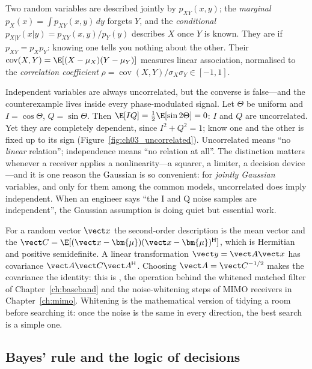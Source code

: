 Two random variables are described jointly by $p_{XY}(x,y)$; the \emph{marginal}
$p_X(x)=\int p_{XY}(x,y)\,dy$ forgets $Y$, and the \emph{conditional}
$p_{X|Y}(x|y)=p_{XY}(x,y)/p_Y(y)$ describes $X$ once $Y$ is known. They are  if
$p_{XY}=p_Xp_Y$: knowing one tells you nothing about the other. Their 
$\operatorname{cov}(X,Y)=\E[(X-\mu_X)(Y-\mu_Y)]$ measures linear association, normalised to the
\emph{correlation coefficient} $\rho=\operatorname{cov}(X,Y)/\sigma_X\sigma_Y\in[-1,1]$.


Independent variables are always uncorrelated, but the converse is false---and the
counterexample lives inside every phase-modulated signal. Let $\Theta$ be uniform and
$I=\cos\Theta$, $Q=\sin\Theta$. Then $\E[IQ]=\tfrac12\E[\sin2\Theta]=0$: $I$ and $Q$ are
uncorrelated. Yet they are completely dependent, since $I^2+Q^2=1$; know one and the other is
fixed up to its sign (Figure~\ref{fig:ch03_uncorrelated}). Uncorrelated means ``no \emph{linear}
relation''; independence means ``no relation at all''. The distinction matters whenever a
receiver applies a nonlinearity---a squarer, a limiter, a decision device---and it is one reason the
Gaussian is so convenient: for \emph{jointly Gaussian} variables, and only for them among the
common models, uncorrelated does imply independent. When an engineer says ``the I and Q noise
samples are independent'', the Gaussian assumption is doing quiet but essential work.

For a random vector $\vect x$ the second-order description is the mean vector and the
 $\vect C=\E[(\vect x-\bm{\mu})(\vect x-\bm{\mu})^{\mathsf H}]$, which is
Hermitian and positive semidefinite. A linear transformation $\vect y=\vect A\vect x$ has
covariance $\vect A\vect C\vect A^{\mathsf H}$. Choosing $\vect A=\vect C^{-1/2}$ makes the
covariance the identity: this is , the operation behind the whitened matched filter
of Chapter~\ref{ch:baseband} and the noise-whitening steps of MIMO receivers in
Chapter~\ref{ch:mimo}. Whitening is the mathematical version of tidying a room before searching
it: once the noise is the same in every direction, the best search is a simple one.

\subsection{Bayes' rule and the logic of decisions}


